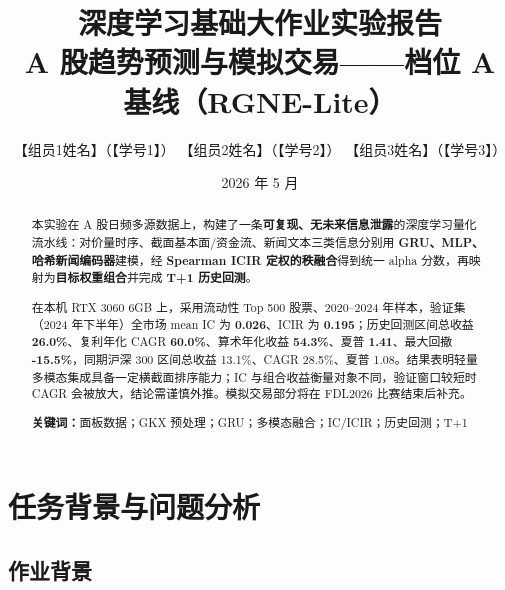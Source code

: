 \documentclass[UTF8,a4paper,12pt]{ctexart}
\title{\textbf{深度学习基础大作业实验报告}\\[0.4em]
\large A 股趋势预测与模拟交易——档位 A 基线（RGNE-Lite）}
\author{
  【组员1姓名】（【学号1】）\quad
  【组员2姓名】（【学号2】）\quad
  【组员3姓名】（【学号3】）
}
\date{2026 年 5 月}
\begin{document}
\maketitle
\thispagestyle{empty}

\begin{center}
\end{center}

\begin{abstract}
本实验在 A 股日频多源数据上，构建了一条\textbf{可复现、无未来信息泄露}的深度学习量化流水线：对价量时序、截面基本面/资金流、新闻文本三类信息分别用 \textbf{GRU、MLP、哈希新闻编码器}建模，经 \textbf{Spearman ICIR 定权的秩融合}得到统一 alpha 分数，再映射为\textbf{目标权重组合}并完成 \textbf{T+1 历史回测}。

在本机 RTX 3060 6GB 上，采用流动性 Top 500 股票、2020--2024 年样本，验证集（2024 年下半年）全市场 mean IC 为 \textbf{0.026}、ICIR 为 \textbf{0.195}；历史回测区间总收益 \textbf{26.0\%}、复利年化 CAGR \textbf{60.0\%}、算术年化收益 \textbf{54.3\%}、夏普 \textbf{1.41}、最大回撤 \textbf{-15.5\%}，同期沪深 300 区间总收益 13.1\%、CAGR 28.5\%、夏普 1.08。结果表明轻量多模态集成具备一定横截面排序能力；IC 与组合收益衡量对象不同，验证窗口较短时 CAGR 会被放大，结论需谨慎外推。模拟交易部分将在 FDL2026 比赛结束后补充。

\vspace{0.5em}
\noindent\textbf{关键词：}面板数据；GKX 预处理；GRU；多模态融合；IC/ICIR；历史回测；T+1
\end{abstract}

\tableofcontents
\newpage

\section{任务背景与问题分析}

\subsection{作业背景}
\end{document}
